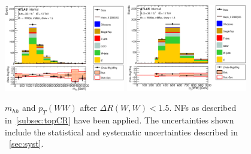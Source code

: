 \begin{figure}[!h]
\begin{center}
\includegraphics*[width=0.47\textwidth] {figures/ControlPlots/reOpt2000/C_mBBcr_reOpt2000_bbpt350_wwpt250_drww15_hhMass_regionA_met25d020}
\includegraphics*[width=0.47\textwidth] {figures/ControlPlots/reOpt2000/C_mBBcr_reOpt2000_bbpt350_wwpt250_drww15_WWPt_regionA_met25d020.eps}
\caption[$m_{hh}$ and  $p_{T}(WW)$ after $\Delta R(W,W) < 1.5$.]{$m_{hh}$ and  $p_{T}(WW)$ after $\Delta R(W,W) < 1.5$.  \ttbar NFs as described in~\ref{subsec:topCR} have been applied. The uncertainties shown include the statistical and systematic uncertainties described in ~\ref{sec:syst}.}
\end{center}
\end{figure}

